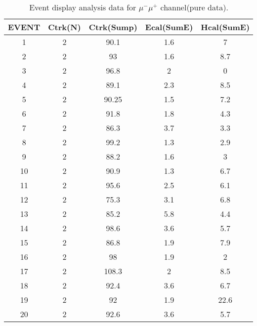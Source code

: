     \begin{table}[h!]
    \centering
    \caption{Event display analysis data for $\mu^-\mu^+$ channel(pure data).}
    \begin{tabular}{ccccc}
    \hline
    EVENT & Ctrk(N) & Ctrk(Sump) & Ecal(SumE) & Hcal(SumE) \\ \hline
    1     & 2       & 90.1       & 1.6        & 7          \\
    2     & 2       & 93         & 1.6        & 8.7        \\
    3     & 2       & 96.8       & 2          & 0          \\
    4     & 2       & 89.1       & 2.3        & 8.5        \\
    5     & 2       & 90.25      & 1.5        & 7.2        \\
    6     & 2       & 91.8       & 1.8        & 4.3        \\
    7     & 2       & 86.3       & 3.7        & 3.3        \\
    8     & 2       & 99.2       & 1.3        & 2.9        \\
    9     & 2       & 88.2       & 1.6        & 3          \\
    10    & 2       & 90.9       & 1.3        & 6.7        \\
    11    & 2       & 95.6       & 2.5        & 6.1        \\
    12    & 2       & 75.3       & 3.1        & 6.8        \\
    13    & 2       & 85.2       & 5.8        & 4.4        \\
    14    & 2       & 98.6       & 3.6        & 5.7        \\
    15    & 2       & 86.8       & 1.9        & 7.9        \\
    16    & 2       & 98         & 1.9        & 2          \\
    17    & 2       & 108.3      & 2          & 8.5        \\
    18    & 2       & 92.4       & 3.6        & 6.7        \\
    19    & 2       & 92         & 1.9        & 22.6       \\
    20    & 2       & 92.6       & 3.6        & 5.7       \\ \hline
    \end{tabular}
    \label{table:ed-mm}
    \end{table}
    
